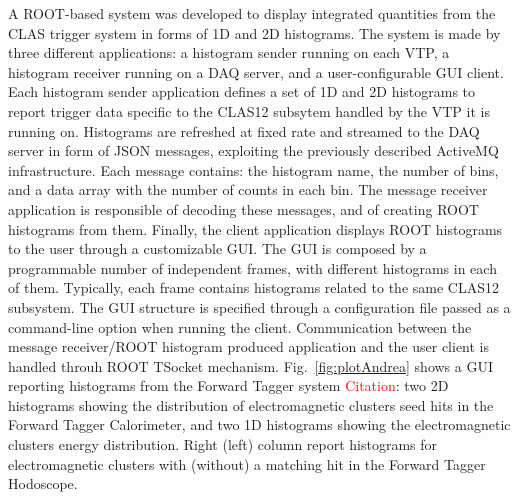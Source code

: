 A ROOT-based system was developed to display integrated quantities from the CLAS trigger system in forms of 1D and 2D histograms. The system is made by three different applications: a histogram sender running on each VTP, a histogram receiver running on a DAQ server, and a user-configurable GUI client.
Each histogram sender application defines a set of 1D and 2D histograms to report trigger data specific to the CLAS12 subsytem handled by the VTP it is running on. Histograms are refreshed at fixed rate and streamed to the DAQ server in form of JSON messages, exploiting the previously described ActiveMQ infrastructure. Each message contains: the histogram name, the number of bins, and a data array with the number of counts in each bin.
The message receiver application is responsible of decoding these messages, and of creating ROOT histograms from them. 
Finally, the client application displays ROOT histograms to the user through a customizable GUI. The GUI is composed by a programmable number of independent frames, with different histograms in each of them. Typically, each frame contains histograms related to the same CLAS12 subsystem. The GUI structure is specified through a configuration file passed as a command-line option when running the client. Communication between the message receiver/ROOT histogram produced application and the user client is handled throuh ROOT TSocket mechanism.
Fig.~\ref{fig:plotAndrea} shows a GUI reporting histograms from the Forward Tagger system \textcolor{red}{Citation}: two 2D histograms showing the distribution of electromagnetic clusters seed hits in the Forward Tagger Calorimeter, and two 1D histograms showing the electromagnetic clusters energy distribution. Right (left) column report histograms for electromagnetic clusters  with (without) a matching hit in the Forward Tagger Hodoscope.


